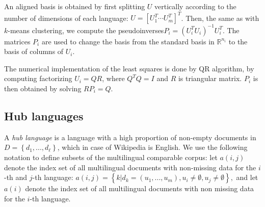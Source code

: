 \documentclass[twoside,11pt]{article}
\newcommand{\RR}{\mathbb{R}}
\begin{document}
An aligned basis is obtained by first splitting $U$ vertically according to the number of dimensions of each language: $U = [U_1^T \cdots U_m^T]^T$. Then, the same as with $k$-means clustering, we compute the pseudoinverses$P_i = (U_i^T U_i)^{-1} U_i^T$. The matrices $P_i$ are used to change the basis from the standard basis in $\RR^{n_i}$ to the basis of columns of $U_i$.

The numerical implementation of the least squares is done by QR algorithm, by computing factorizing $U_i = Q R$, where $Q^TQ = I$ and $R$ is triangular matrix. $P_i$ is then obtained by solving $R P_i = Q$.



\subsection{Hub languages}

A \emph{hub language} is a language with a high proportion of non-empty documents in $D = \left\{d_1,..., d_{\ell}\right\}$, which in case of Wikipedia is English. We use the following notation to define subsets
of the multilingual comparable corpus: let $a(i,j)$ denote the index set of all multilingual documents with non-missing data for the $i$-th and $j$-th language:  $a(i,j) = \left\{k | d_k = (u_1,...,u_m), u_i \neq \emptyset, u_j \neq \emptyset \right\},$ and let $a(i)$ denote the index set of all multilingual documents with non missing data for the $i$-th language.
\end{document}
